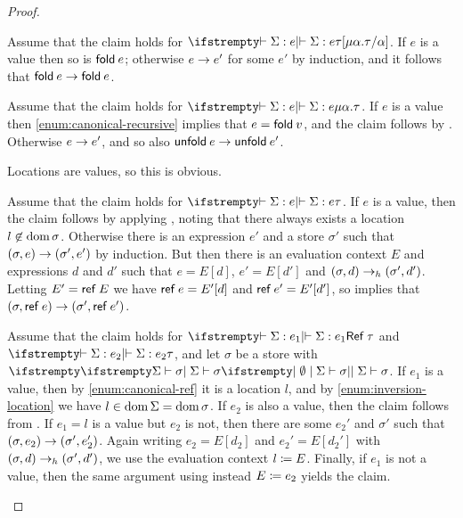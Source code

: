 \begin{proof}
\begin{proofsec}
    \item[\ruleref{Tfold}]
    Assume that the claim holds for $\typerel{}{}{\Sigma}{e}{\tau[\typeRec{\alpha}{\tau}/\alpha]}$. If $e$ is a value then so is $\expFold{e}$; otherwise $e \to e'$ for some $e'$ by induction, and it follows that $\expFold{e} \step \expFold{e}$.

    \item[\ruleref{Tunfold}]
    Assume that the claim holds for $\typerel{}{}{\Sigma}{e}{\typeRec{\alpha}{\tau}}$. If $e$ is a value then \cref{enum:canonical-recursive} implies that $e = \expFold{v}$, and the claim follows by . Otherwise $e \to e'$, and so also $\mathsf{unfold}\: e \to \mathsf{unfold}\: e'$.

    \item[\ruleref{Tloc}]
    Locations are values, so this is obvious.

    \item[\ruleref{Talloc}]
    Assume that the claim holds for $\typerel{}{}{\Sigma}{e}{\tau}$. If $e$ is a value, then the claim follows by applying , noting that there always exists a location $l \not\in \operatorname{dom}{\sigma}$. Otherwise there is an expression $e'$ and a store $\sigma'$ such that $(\sigma,e) \to (\sigma',e')$ by induction. But then there is an evaluation context $E$ and expressions $d$ and $d'$ such that $e = E[d]$, $e' = E[d']$ and $(\sigma,d) \to_h (\sigma',d')$. Letting $E' = \mathsf{ref}\: E$ we have $\mathsf{ref}\: e = E'[d]$ and $\mathsf{ref}\: e' = E'[d']$, so  implies that $(\sigma,\mathsf{ref}\: e) \to (\sigma',\mathsf{ref}\: e')$.

    \item[\ruleref{Tstore}]
    Assume that the claim holds for $\typerel{}{}{\Sigma}{e_1}{\typeRef{\tau}}$ and $\typerel{}{}{\Sigma}{e_2}{\tau}$, and let $\sigma$ be a store with $\stotype{}{}{\Sigma}{\sigma}$. If $e_1$ is a value, then by \cref{enum:canonical-ref} it is a location $l$, and by \cref{enum:inversion-location} we have $l \in \operatorname{dom}{\Sigma} = \operatorname{dom}{\sigma}$. If $e_2$ is also a value, then the claim follows from . If $e_1 = l$ is a value but $e_2$ is not, then there are some $e_2'$ and $\sigma'$ such that $(\sigma,e_2) \to (\sigma',e_2')$. Again writing $e_2 = E[d_2]$ and $e_2' = E[d_2']$ with $(\sigma,d) \to_h (\sigma',d')$, we use the evaluation context $\textcolor{black}{l} \coloneqq \textcolor{black}{E}$. Finally, if $e_1$ is not a value, then the same argument using instead $\textcolor{black}{E} \coloneqq \textcolor{black}{e_2}$ yields the claim.


\end{proofsec}
\end{proof}
